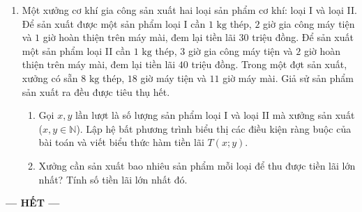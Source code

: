 \documentclass[12pt,a4paper]{article}
\begin{document}
\begin{enumerate}
\begin{minipage}[t]{0.42\linewidth}
\end{minipage}
\item Một xưởng cơ khí gia công sản xuất hai loại sản phẩm cơ khí: loại I và loại II. Để sản xuất được một sản phẩm loại I cần $1\text{ kg}$ thép, $2$ giờ gia công máy tiện và $1$ giờ hoàn thiện trên máy mài, đem lại tiền lãi $30$ triệu đồng. Để sản xuất một sản phẩm loại II cần $1\text{ kg}$ thép, $3$ giờ gia công máy tiện và $2$ giờ hoàn thiện trên máy mài, đem lại tiền lãi $40$ triệu đồng. Trong một đợt sản xuất, xưởng có sẵn $8\text{ kg}$ thép, $18$ giờ máy tiện và $11$ giờ máy mài. Giả sử sản phẩm sản xuất ra đều được tiêu thụ hết.
\begin{enumerate}
\item Gọi $x, y$ lần lượt là số lượng sản phẩm loại I và loại II mà xưởng sản xuất ($x, y \in \mathbb{N}$). Lập hệ bất phương trình biểu thị các điều kiện ràng buộc của bài toán và viết biểu thức hàm tiền lãi $T(x; y)$.
\item Xưởng cần sản xuất bao nhiêu sản phẩm mỗi loại để thu được tiền lãi lớn nhất? Tính số tiền lãi lớn nhất đó.
\end{enumerate}
\end{enumerate}
\par\vspace{3pt}
\centerline{\textbf{--- HẾT ---}}
\end{document}
